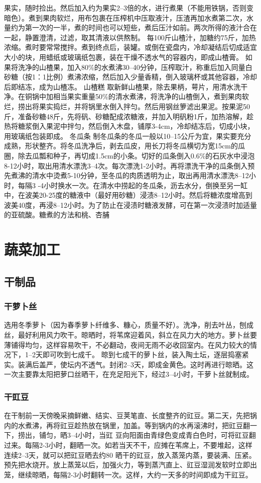 \documentclass{ctexbook}
\begin{document}
果实，随时捡出。然后加入约为果实2--3倍的水，进行煮果（不能用铁锅，否则变暗色）。煮到果肉软烂，用布包裹在压榨机中压取液汁，压渣再加水煮第二次，水量约为第一次的一半，煮的时间也可以短些，煮后压汁如前。两次所得的液汁合在一起，静置澄清，过滤，取其清液以供熬制。
每100斤山楂汁，加糖约75斤，加热浓缩。煮时要常常搅拌。煮到终点后，装罐。或倒在瓷盘内，冷却凝结后切成适宜大小的块，用蜡纸或玻璃纸包裹，装在干燥不透水气的容器内，即成山楂膏。
如果将洗净的山楂果，加入80\%的水煮沸30--40分钟，压榨取汁，称重后加入同量白砂糖（按1：1比例）煮沸浓缩，然后加入少量香精，倒入玻璃杯或其他容器，冷却后即结冻，成为山楂冻。
山楂糕
取新鲜山楂果，除去果柄，萼片，用清水洗干净。在铜锅中加相当果实重量50\%的清水煮沸，将洗净的山楂倒入，煮到果肉软烂，捞出将果实捣烂，并将锅里水倒入拌匀。然后用钢丝箩滤出果泥。按果泥50斤，准备砂糖48斤，先将矾、砂糖配成浓糖液，并加入明矾粉1斤，加热溶解，趁热将糖浆倒入果泥中拌匀，然后倒入木盘，铺厚3-4cm，冷却结冻后，切成小块，用玻璃纸包装即成。
冬瓜条
制冬瓜条的冬瓜一般以10--15公斤为宜，果实要充分成熟，形状整齐。将冬瓜洗净后，剥去瓜皮，用长刀将冬瓜横切为宽15cm的瓜圈，除去瓜瓢和种子，再切成1.5cm的小条。切好的瓜条倒入0.6\%的石灰水中浸泡8-12小时，取出用清水漂洗3--4次。每次漂洗1-2小时。再将漂洗干净的瓜条倒入预先煮沸的清水中烫煮5-10分钟，至冬瓜的肉质透明为止，取出再用清水漂洗8--12小时，每隔3
-4小时换水一次。在清水中捞起的冬瓜条，沥去水分，倒换至另一缸中，在波美20-25度的糖液中（最好用砂糖）浸渍8--12小时。然后将糖浓度增高到波美40度，再浸8--12小时。为了防止在浸渍时糖液发酵，可在第一次浸渍时加适量的亚硫酸。糖煮的方法和桃、杏脯
\chapter{蔬菜加工}
\section{干制品}
\subsection{干萝卜丝}
选用冬季萝卜（因为春季萝卜纤维多、糠心，质量不好）。洗净，削去叶丛，刨成丝，最好利用风力吹干。晾晒时，将苇席迎着风，斜立在风力大的地方。萝卜丝要薄铺得均匀，这样容易吹干，不必翻动，夜间无雨不必收回室内。在风力较大的情况下，1--2天即可吹到七成千。
晾到七成干的萝卜丝，装入陶土坛，逐层捣塞紧实。装满后盖严，使坛内不透气。封闭2--3天，即成金黄色。这时再进行晾晒。这一次主要靠太阳把萝口丝晒干，在充足阳光下，经过3--4小时，干萝卜丝就制成。
\subsection{干豇豆}
在干制前一天傍晚采摘鲜嫩、结实、豆荚笔直、长度整齐的豇豆。第二天，先把锅内的水煮沸，再将豇豆趁热放在锅里，加盖。等到锅内的水再滚沸时，把豇豆翻一下，捞出，铺匀，晒3--4小时，当豇
豆向阳面由青绿色变成青白色时，可将豇豆翻过来。每隔2-3小时，翻晒一次。如若当天不干，应摊在苇席上，不要堆起，这样连续2--3天，就可以把豇豆晒去约80%
晒干的豇豆，放入蒸笼内蒸，要装满、压紧。预先把水烧开。放上蒸笼以后，加强火力，等到蒸汽直上、豇豆湿润发软时立即出笼，继续晾晒，每隔2-3小时翻转一次。这样，大约一天多的时间即成为干豇豆。
\end{document}
